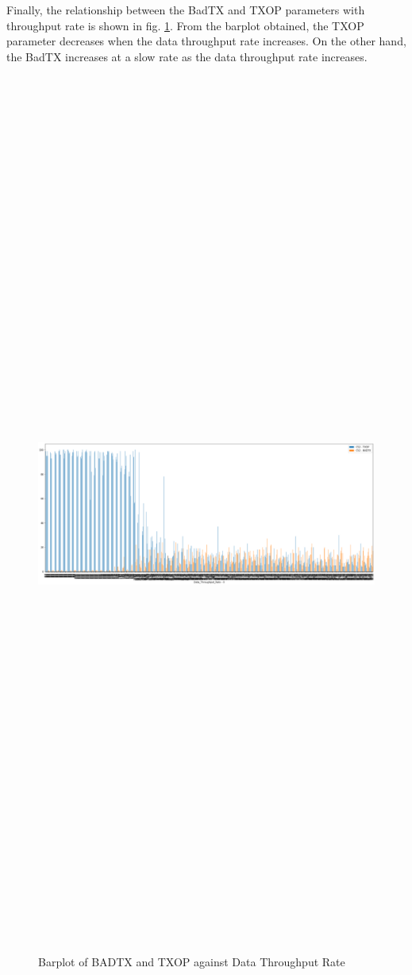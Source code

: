 Finally, the relationship between the BadTX and TXOP parameters with throughput rate is shown in fig. \ref{fig_bp3}. From the barplot obtained, the TXOP parameter decreases when the data throughput rate increases. On the other hand, the BadTX increases at a slow rate as the data throughput rate increases.
\begin{figure} [ht]
    \centering
    \includegraphics[width=14.6cm,height=200.0cm,keepaspectratio]{pages/Chapter4/Chapter 4 Images/Bplot3.PNG}
    \caption{Barplot of BADTX and TXOP against Data Throughput Rate}
    \label{fig_bp3}
\end{figure}


